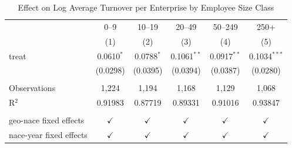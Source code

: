 \begin{table}[htbp]
   \caption{\label{tab:turnover} Effect on Log Average Turnover per Enterprise by Employee Size Class}
   \bigskip
   \centering
   \begin{tabular}{lccccc}
      \toprule
                              & 0--9          & 10--19        & 20--49        & 50--249       & 250+ \\   
                              & (1)           & (2)           & (3)           & (4)           & (5)\\  
      \midrule 
      treat                   & 0.0610$^{*}$  & 0.0788$^{*}$  & 0.1061$^{**}$ & 0.0917$^{**}$ & 0.1034$^{***}$\\   
                              & (0.0298)      & (0.0395)      & (0.0394)      & (0.0387)      & (0.0280)\\   
       \\
      Observations            & 1,224         & 1,194         & 1,168         & 1,129         & 1,068\\  
      R$^2$                   & 0.91983       & 0.87719       & 0.89331       & 0.91016       & 0.93847\\  
       \\
      geo-nace fixed effects  & $\checkmark$  & $\checkmark$  & $\checkmark$  & $\checkmark$  & $\checkmark$\\   
      nace-year fixed effects & $\checkmark$  & $\checkmark$  & $\checkmark$  & $\checkmark$  & $\checkmark$\\   
      \bottomrule
   \end{tabular}
\end{table}
